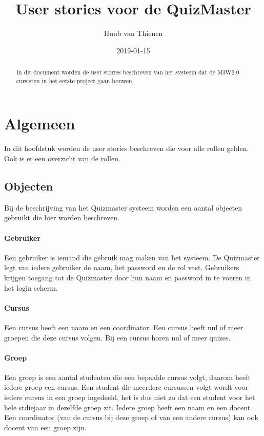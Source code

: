 \documentclass[11pt, a4paper]{article}
\begin{document}
\title{User stories voor de QuizMaster}
\date{2019-01-15}
\author{Huub van Thienen}
\maketitle
\begin{abstract}
In dit document worden de user stories beschreven van het systeem dat de MIW2.0 cursisten in het eerste project gaan bouwen.
\end{abstract}

\section{Algemeen}

In dit hoofdstuk worden de user stories beschreven die voor alle rollen gelden. Ook is er een overzicht van de rollen.

\subsection{Objecten}
Bij de beschrijving van het Quizmaster systeem worden een aantal objecten gebruikt die hier worden beschreven.

\paragraph{Gebruiker} Een gebruiker is iemand die gebruik mag maken van het systeem. 
De Quizmaster legt van iedere gebruiker de naam, het password en de rol vast. 
Gebruikers krijgen toegang tot de Quizmaster door hun naam en password in te voeren in het login scherm.

\paragraph{Cursus} Een cursus heeft een naam en een coordinator.
Een cursus heeft nul of meer groepen die deze cursus volgen.
Bij een cursus horen nul of meer quizes.

\paragraph{Groep} Een groep is een aantal studenten die een bepaalde cursus volgt, daarom heeft iedere groep een cursus.
Een student die meerdere cursussen volgt wordt voor iedere cursus in een groep ingedeeld, het is dus niet zo dat een student voor het hele stdiejaar in dezelfde groep zit.
Iedere groep heeft een naam en een docent.
Een coordinator (van de cursus bij deze groep of van een andere cursus) kan ook docent van een groep zijn.
\end{document}
